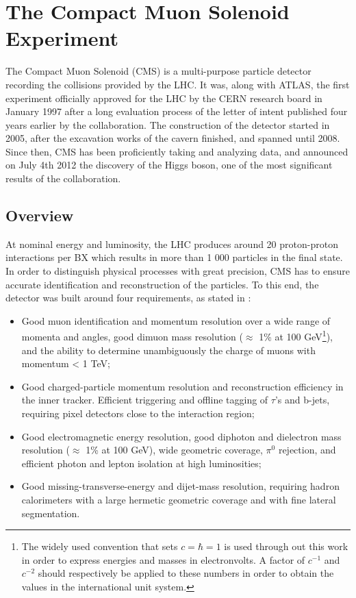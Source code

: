 \chapter{The Compact Muon Solenoid Experiment}
\label{chap:I-3-cms}

	The Compact Muon Solenoid (CMS) \cite{1748-0221-3-08-S08004} is a multi-purpose particle detector recording the collisions provided by the LHC. It was, along with ATLAS, the first experiment officially approved for the LHC by the CERN research board in January 1997 after a long evaluation process of the letter of intent published four years earlier by the collaboration. The construction of the detector started in 2005, after the excavation works of the cavern finished, and spanned until 2008. Since then, CMS has been proficiently taking and analyzing data, and announced on July 4th 2012 the discovery of the Higgs boson, one of the most significant results of the collaboration.

  \section{Overview}

    At nominal energy and luminosity, the LHC produces around 20 proton-proton interactions per BX which results in more than 1 000 particles in the final state. In order to distinguish physical processes with great precision, CMS has to ensure accurate identification and reconstruction of the particles. To this end, the detector was built around four requirements, as stated in \cite{1748-0221-3-08-S08004}:
    \begin{itemize}
      \item Good muon identification and momentum resolution over a wide range of momenta and angles, good dimuon mass resolution ($ \approx $ 1\% at 100 GeV\footnote{The widely used convention that sets $ c = \hbar = 1 $ is used through out this work in order to express energies and masses in electronvolts. A factor of $c^{-1}$ and $c^{-2}$ should respectively be applied to these numbers in order to obtain the values in the international unit system.}), and the ability to determine unambiguously the charge of muons with momentum < 1 TeV;
      \item Good charged-particle momentum resolution and reconstruction efficiency in the inner tracker. Efficient triggering and offline tagging of $ \tau $'s and b-jets, requiring pixel detectors close to the interaction region;
      \item Good electromagnetic energy resolution, good diphoton and dielectron mass resolution ($ \approx $ 1\% at 100 GeV), wide geometric coverage, $ \pi^0 $ rejection, and efficient photon and lepton isolation at high luminosities;
      \item Good missing-transverse-energy and dijet-mass resolution, requiring hadron calorimeters with a large hermetic geometric coverage and with fine lateral segmentation. \\
    \end{itemize}

